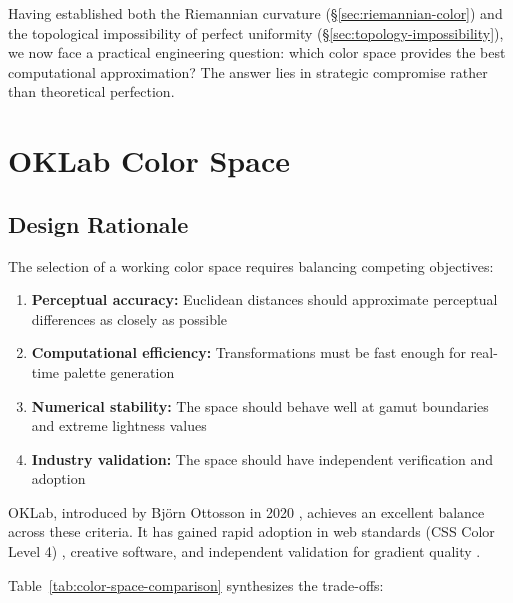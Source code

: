 Having established both the Riemannian curvature (\S\ref{sec:riemannian-color}) and the topological impossibility of perfect uniformity (\S\ref{sec:topology-impossibility}), we now face a practical engineering question: which color space provides the best computational approximation? The answer lies in strategic compromise rather than theoretical perfection.

\section{OKLab Color Space}
\label{sec:oklab}
\label{sec:oklab-implementation}

\subsection{Design Rationale}

The selection of a working color space requires balancing competing objectives:

\begin{enumerate}
    \item \textbf{Perceptual accuracy:} Euclidean distances should approximate perceptual differences as closely as possible
    \item \textbf{Computational efficiency:} Transformations must be fast enough for real-time palette generation
    \item \textbf{Numerical stability:} The space should behave well at gamut boundaries and extreme lightness values
    \item \textbf{Industry validation:} The space should have independent verification and adoption
\end{enumerate}

OKLab, introduced by Björn Ottosson in 2020 \citep{ottosson2020}, achieves an excellent balance across these criteria. It has gained rapid adoption in web standards (CSS Color Level 4) \citep{csscolor4}, creative software, and independent validation for gradient quality \citep{levien2021oklab}.

Table~\ref{tab:color-space-comparison} synthesizes the trade-offs:

